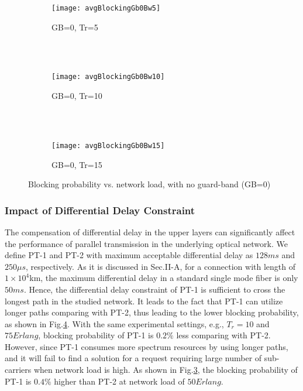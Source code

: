 \documentclass[conference]{IEEEtran}
\begin{document}
\begin{figure}
        \centering
        \begin{subfigure}[b]{0.47\textwidth}
                \centering
                \texttt{[image: avgBlockingGb0Bw5]}
                \caption{ GB=0, Tr=5 }
                \label{fig:gb0-1}
        \end{subfigure} \\
        ~ \begin{subfigure}[b]{0.47\textwidth}
                \centering
                \texttt{[image: avgBlockingGb0Bw10]}
                \caption{ GB=0, Tr=10}
                \label{fig:gb0-2}
        \end{subfigure}\\
        ~ \begin{subfigure}[b]{0.47\textwidth}
                \centering
                \texttt{[image: avgBlockingGb0Bw15]}
                \caption{GB=0, Tr=15}
                \label{fig:gb0-3}
        \end{subfigure}
        \caption{Blocking probability vs. network load, with no guard-band (GB=0)}\label{fig:gb0} 
\end{figure} 

\subsubsection{Impact of Differential Delay Constraint}
The compensation of differential delay in the upper layers can significantly  affect the performance of parallel 
transmission in the underlying optical network. We define PT-1 and PT-2 with maximum acceptable differential 
delay as $128ms$ and $250\mu s$, respectively. As it is discussed in Sec.II-A, for a connection with length of $1\times 
10^4$km, the maximum differential delay in a standard single mode fiber is only $50ms$. Hence,  the differential delay 
constraint of PT-1 is sufficient to cross the longest path in the studied network. It leads to the fact that PT-1 can utilize 
longer paths comparing with PT-2, thus leading to the lower blocking probability, as shown in Fig.\ref{fig:gb0}. With the 
same experimental settings, e.g., $T_r=10$ and $75 Erlang$, blocking probability of PT-1 is $0.2\%$ less comparing 
with PT-2. However, since PT-1 consumes more spectrum resources by using longer paths, and it will fail to find a solution 
for a request requiring large number of sub-carriers when network load is high. As shown in Fig.\ref{fig:gb0-3}, the 
blocking probability of PT-1 is $0.4\%$ higher than PT-2 at network load of $50Erlang$.
\end{document}
